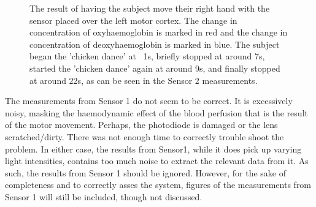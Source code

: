 \begin{figure}[htp]
\centering
{}
\caption[Left Motor Cortex Measurements with Motor Movement]{The result of having the subject move their right hand with the sensor placed over the left motor cortex. The change in concentration of oxyhaemoglobin is marked in red and the change in concentration of deoxyhaemoglobin is marked in blue. The subject began the 'chicken dance' at ~1s, briefly stopped at around 7s, started the 'chicken dance' again at around 9s, and finally stopped at around 22s, as can be seen in the Sensor 2 measurements.}
\end{figure}

The measurements from Sensor 1 do not seem to be correct. It is excessively noisy, masking the haemodynamic effect of the blood perfusion that is the result of the motor movement. Perhaps, the photodiode is damaged or the lens scratched/dirty. There was not enough time to correctly trouble shoot the problem. In either case, the results from Sensor1, while it does pick up varying light intensities, contains too much noise to extract the relevant data from it. As such, the results from Sensor 1 should be ignored. However, for the sake of completeness and to correctly asses the system, figures of the measurements from Sensor 1 will still be included, though not discussed. 

